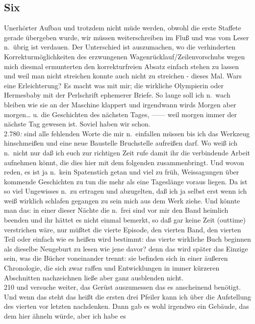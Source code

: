 \documentclass[
]{article}
\author{}
\date{\vspace{-2.5em}}
\begin{document}
\subsection{Six}\label{six}

Unerhörter Aufbau und trotzdem nicht müde werden, obwohl die erste
Staffete gerade übergeben wurde, wir müssen weiterschreiben im Fluß und
was vom Leser n.~übrig ist verdauen. Der Unterschied ist auszumachen, wo
die verhinderten Korrekturmöglichkeiten des erzwungenen
Wagenrücklauf/Zeilenvorschubs wegen mich diesmal ermunterten den
korrekturfreien Absatz einfach stehen zu lassen und weil man nicht
streichen konnte auch nicht zu streichen - dieses Mal. Wars eine
Erleichterung? Es macht was mit mir; die wirkliche Olympierin oder
Hermesbaby mit der Perlschrift ephemerer Briefe. So lange soll ich
n.~wach bleiben wie sie an der Maschine klappert und irgendwann wirds
Morgen aber morgen\ldots{} u. die Geschichten des nächsten Tages, ------
weil morgen immer der nächste Tag gewesen ist. Soviel haben wir schon.\\
2\emph{.}780\emph{:} sind alle fehlenden Worte die mir n.~einfallen
müssen bis ich das Werkzeug hinschmeißen und eine neue Baustelle
Bruchstelle aufreißen darf. Wo weiß ich n.~nicht nur daß ich euch zur
richtigen Zeit rufe damit ihr die verbindende Arbeit aufnehmen könnt,
die dies hier mit dem folgenden zusammenbringt. Und wovon reden, es ist
ja n.~kein Spatenstich getan und viel zu früh, Weissagungen über
kommende Geschichten zu tun die mehr als eine Tageslänge voraus liegen.
Da ist so viel Ungewisses n.~zu ertragen und abzugelten, daß ich ja
selbst erst wenn ich weiß wirklich schlafen gegangen zu sein mich aus
dem Werk ziehe. Und könnte man das: in einer dieser Nächte die n.~frei
sind vor mir den Band heimlich beenden und ihr hättet es nicht einmal
bemerkt, so daß gar keine Zeit (outtime) verstrichen wäre, nur müßtet
die vierte Episode, den vierten Band, den vierten Teil oder einfach wie
es heißen wird bestimmt: das vierte wirkliche Buch beginnen als dieselbe
Neugeburt zu lesen wie jene davor? denn das wird später das Einzige
sein, was die Bücher voneinander trennt: sie befinden sich in einer
äußeren Chronologie, die sich zwar raffen und Entwicklungen in immer
kürzeren Abschnitten nachzeichnen ließe aber ganz ausblenden nicht.\\
210 und versuche weiter, das Gerüst auszumessen das es anscheinend
benötigt. Und wenn das steht das heißt die ersten drei Pfeiler kann ich
über die Aufstellung des vierten vor letzten nachdenken. Dann gab es
wohl irgendwo ein Gebäude, das dem hier ähneln würde, aber ich habe es
\end{document}
